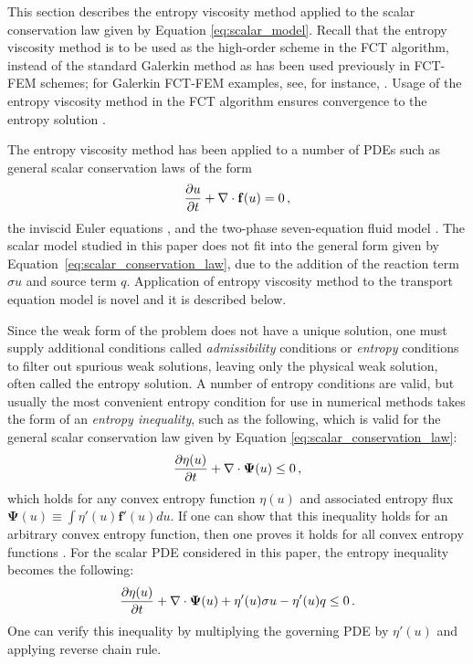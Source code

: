 
This section describes the entropy viscosity method applied to the scalar
conservation law given by Equation \eqref{eq:scalar_model}. Recall that the entropy
viscosity method is to be used as the high-order scheme in the FCT algorithm,
instead of the standard Galerkin method as has been used previously in FCT-FEM schemes;
 for Galerkin FCT-FEM examples, see, for instance, \cite{kuzmin_FCT} .
Usage of the entropy viscosity method in the FCT algorithm ensures convergence
to the entropy solution \cite{guermond_secondorder}.

The entropy viscosity method has been applied to a number of PDEs
such as general scalar conservation laws of the form
\begin{equation}\label{eq:scalar_conservation_law}
  \frac{\partial u}{\partial t} + \nabla\cdot\mathbf{f}(u) = 0 \,,
\end{equation}
the inviscid Euler equations \cite{guermond_ev,marco_low_mach}, 
and the two-phase seven-equation fluid model \cite{marco_SEM}. The scalar model studied
in this paper does not fit into the general form given by Equation~\eqref{eq:scalar_conservation_law},
due to
the addition of the reaction term $\sigma u$ and source term $q$. Application
of entropy viscosity method to the transport equation model is novel and it is described below.

Since the weak form of the problem does not have a unique solution, one
must supply additional conditions called \emph{admissibility} conditions or
\emph{entropy} conditions to filter out spurious weak solutions, leaving
only the physical weak solution, often called the entropy solution.
A number of entropy conditions are valid, but usually the most convenient
entropy condition for use in numerical methods takes the form of an
\emph{entropy inequality}, such as the following, which is valid for the
general scalar conservation law given by Equation \eqref{eq:scalar_conservation_law}:
\begin{equation}
  \frac{\partial \eta(u)}{\partial t} + \nabla\cdot\mathbf{\Psi}(u) \leq 0 \,,
\end{equation}
which holds for any convex entropy function $\eta(u)$ and associated entropy
flux $\mathbf{\Psi}(u) \equiv \int \eta'(u)\mathbf{f}'(u)du$.
If one can show that this inequality holds for an arbitrary
convex entropy function, then one proves it holds for all convex entropy
functions  \cite{leveque2002}\cite{guermond_ev}.
For the scalar PDE considered in this paper, the entropy inequality becomes
the following:
\begin{equation}
  \frac{\partial \eta(u)}{\partial t} + \nabla\cdot\mathbf{\Psi}(u) + \eta'(u)\sigma u - \eta'(u)q
    \leq 0 \,.
\end{equation}
One can verify this inequality by multiplying the governing PDE by $\eta'(u)$
and applying reverse chain rule.

